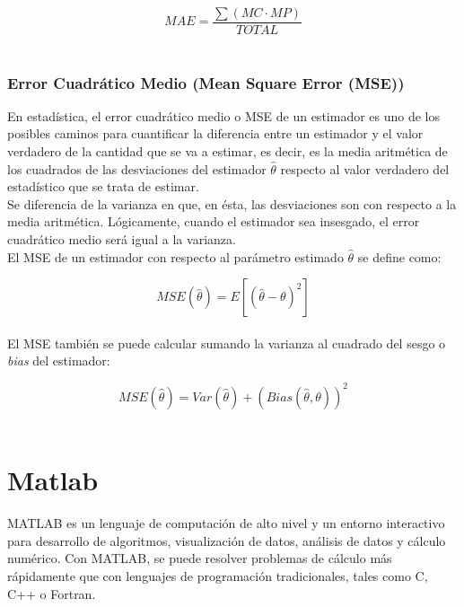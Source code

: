 			\begin{equation}
				MAE = \frac{\sum{(MC \cdot{} MP)}}{TOTAL}
				\label{matriz_mae}
			\end{equation}
			\\
			
			\subsubsection{Error Cuadrático Medio (Mean Square Error (MSE))}
			
			En estadística, el error cuadrático medio o MSE de un estimador es uno de los posibles caminos para cuantificar la diferencia entre un estimador y el valor verdadero de la cantidad que se va a estimar, es decir, es la media aritmética de los cuadrados de las desviaciones del estimador $\hat{\theta}$ respecto al valor verdadero del estadístico que se trata de estimar.\\

			Se diferencia de la varianza en que, en ésta, las desviaciones son con respecto a la media aritmética. Lógicamente, cuando el estimador sea insesgado, el error cuadrático medio será igual a la varianza.\\
			
			El MSE de un estimador con respecto al parámetro estimado $\hat{\theta}$ se define como:

			\begin{equation}
				MSE(\hat{\theta}) = E[(\hat{\theta}-\theta)^2]
				\label{estimator_mse}
			\end{equation}
			\\

			El MSE también se puede calcular sumando la varianza al cuadrado del sesgo o \textit{bias} del estimador:

			\begin{equation}
				MSE(\hat{\theta}) = Var(\hat{\theta})+\left(Bias(\hat{\theta},\theta)\right)^2
				\label{varianza_mse}
			\end{equation}
			\\
		
	\section{Matlab}
	
		MATLAB es un lenguaje de computación de alto nivel y un entorno interactivo para desarrollo de algoritmos, visualización de datos, análisis de datos y cálculo numérico. Con MATLAB, se puede resolver problemas de cálculo más rápidamente que con lenguajes de programación tradicionales, tales como C, C++ o Fortran.\\
		
